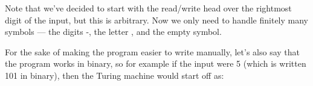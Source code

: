 \begin{center}
\end{center}


\label{chapter:initialCellConvention}Note that we've decided to start with the read/write head over the rightmost digit of the input, but this is arbitrary. Now we only need to handle finitely many symbols --- the digits -, the letter , and the empty symbol.

For the sake of making the program easier to write manually, let's also say that the program works in binary, so for example if the input were 5 (which is written 101 in binary), then the Turing machine would start off as:

